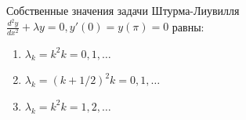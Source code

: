 Собственные значения задачи Штурма-Лиувилля  \(\frac{d^2y}{dx^2}+\lambda y =0, y'\left(0\right)=y\left(\pi \right) =0\) равны:

\begin{enumerate}[label=\arabic*)]
    \item \(\lambda _k=k^2 k=0,1,\dots\)
    \item \(\lambda _k=(k+1/2)^2 k=0,1,\dots\)
    \item \(\lambda _k=k^2 k=1,2,\dots\)
\end{enumerate}

